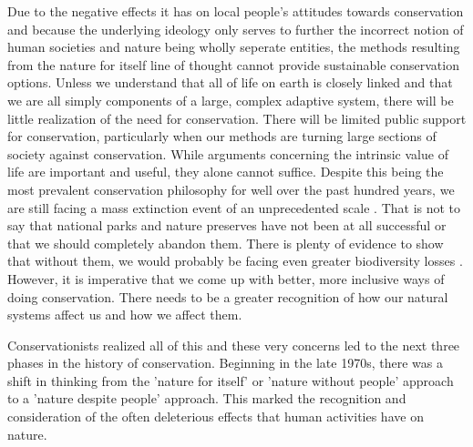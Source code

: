 \documentclass[rutwik_proposal.tex]{subfiles}
\begin{document}
Due to the negative effects it has on local people's attitudes towards conservation and because the underlying ideology only serves to further the incorrect notion of human societies and nature being wholly seperate entities, the methods resulting from the nature for itself line of thought cannot provide sustainable conservation options. Unless we understand that all of life on earth is closely linked and that we are all simply components of a large, complex adaptive system, there will be little realization of the need for conservation. There will be limited public support for conservation, particularly when our methods are turning large sections of society against conservation. While arguments concerning the intrinsic value of life are important and useful, they alone cannot suffice. Despite this being the most prevalent conservation philosophy for well over the past hundred years, we are still facing a mass extinction event of an unprecedented scale \cite{Stuart04, Barnosky11, Dirzo14}. That is not to say that national parks and nature preserves have not been at all successful or that we should completely abandon them. There is plenty of evidence to show that without them, we would probably be facing even greater biodiversity losses \cite{Rodrigues06, Hoffman11, Hoffman10, Chape05}. However, it is imperative that we come up with better, more inclusive ways of doing conservation. There needs to be a greater recognition of how our natural systems affect us and how we affect them.

Conservationists realized all of this and these very concerns led to the next three phases in the history of conservation. Beginning in the late 1970s, there was a shift in thinking from the 'nature for itself' or 'nature without people' approach to a 'nature despite people' approach. This marked the recognition and consideration of the often deleterious effects that human activities have on nature.
\end{document}
